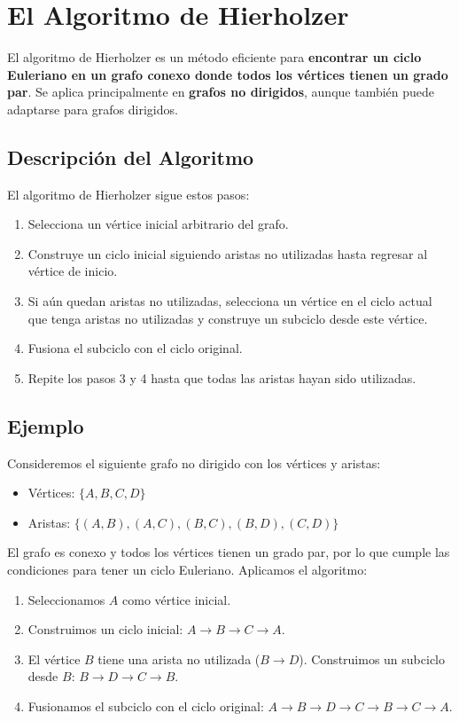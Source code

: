 \documentclass{article}
\begin{document}
\section{El Algoritmo de Hierholzer}

El algoritmo de Hierholzer es un método eficiente para \textbf{encontrar un ciclo Euleriano en un grafo conexo donde todos los vértices tienen un grado par}. Se aplica principalmente en \textbf{grafos no dirigidos}, aunque también puede adaptarse para grafos dirigidos.

\subsection{Descripción del Algoritmo}

El algoritmo de Hierholzer sigue estos pasos:

\begin{enumerate}
    \item Selecciona un vértice inicial arbitrario del grafo.
    \item Construye un ciclo inicial siguiendo aristas no utilizadas hasta regresar al vértice de inicio.
    \item Si aún quedan aristas no utilizadas, selecciona un vértice en el ciclo actual que tenga aristas no utilizadas y construye un subciclo desde este vértice.
    \item Fusiona el subciclo con el ciclo original.
    \item Repite los pasos 3 y 4 hasta que todas las aristas hayan sido utilizadas.
\end{enumerate}

\subsection{Ejemplo}

Consideremos el siguiente grafo no dirigido con los vértices y aristas:

\begin{itemize}
    \item Vértices: \( \{A, B, C, D\} \)
    \item Aristas: \( \{(A, B), (A, C), (B, C), (B, D), (C, D)\} \)
\end{itemize}

El grafo es conexo y todos los vértices tienen un grado par, por lo que cumple las condiciones para tener un ciclo Euleriano. Aplicamos el algoritmo:

\begin{enumerate}
    \item Seleccionamos \( A \) como vértice inicial.
    \item Construimos un ciclo inicial: \( A \to B \to C \to A \).
    \item El vértice \( B \) tiene una arista no utilizada (\( B \to D \)). Construimos un subciclo desde \( B \): \( B \to D \to C \to B \).
    \item Fusionamos el subciclo con el ciclo original: \( A \to B \to D \to C \to B \to C \to A \).
\end{enumerate}
\end{document}
